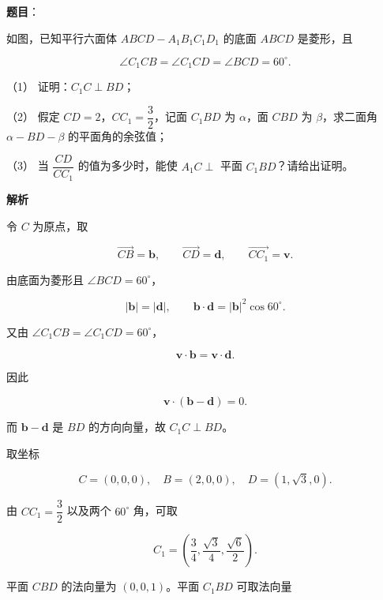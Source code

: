 \begin{answer}

\textbf{题目}：

如图，已知平行六面体 $ABCD-A_1B_1C_1D_1$ 的底面 $ABCD$ 是菱形，且

\nopagebreak[4]
\[
\angle C_1CB=\angle C_1CD=\angle BCD=60^\circ.
\]

（1） 证明：$C_1C\perp BD$；

（2） 假定 $CD=2$，$CC_1=\dfrac32$，记面 $C_1BD$ 为 $\alpha$，面 $CBD$ 为 $\beta$，求二面角 $\alpha-BD-\beta$ 的平面角的余弦值；

（3） 当 $\dfrac{CD}{CC_1}$ 的值为多少时，能使 $A_1C\perp$ 平面 $C_1BD$？请给出证明。
\nopagebreak[4]
\begin{center}\end{center}
\nopagebreak[4]
\textbf{解析}


令 $C$ 为原点，取

\nopagebreak[4]
\[
\overrightarrow{CB}=\mathbf b,\qquad
\overrightarrow{CD}=\mathbf d,\qquad
\overrightarrow{CC_1}=\mathbf v.
\]

由底面为菱形且 $\angle BCD=60^\circ$，

\nopagebreak[4]
\[
|\mathbf b|=|\mathbf d|,\qquad
\mathbf b\cdot\mathbf d=|\mathbf b|^2\cos60^\circ.
\]

又由 $\angle C_1CB=\angle C_1CD=60^\circ$，

\nopagebreak[4]
\[
\mathbf v\cdot\mathbf b=\mathbf v\cdot\mathbf d.
\]

因此

\nopagebreak[4]
\[
\mathbf v\cdot(\mathbf b-\mathbf d)=0.
\]

而 $\mathbf b-\mathbf d$ 是 $BD$ 的方向向量，故 $C_1C\perp BD$。


取坐标

\nopagebreak[4]
\[
C=(0,0,0),\quad B=(2,0,0),\quad D=(1,\sqrt3,0).
\]

由 $CC_1=\dfrac32$ 以及两个 $60^\circ$ 角，可取

\nopagebreak[4]
\[
C_1=\left(\frac34,\frac{\sqrt3}{4},\frac{\sqrt6}{2}\right).
\]

平面 $CBD$ 的法向量为 $(0,0,1)$。平面 $C_1BD$ 可取法向量


\end{answer}

